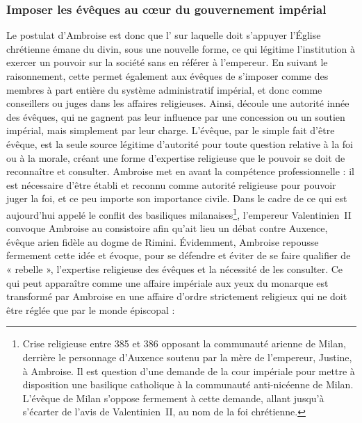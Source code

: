 \bigskip

\subsubsection{Imposer les évêques au cœur du gouvernement impérial}

Le postulat d’Ambroise est donc que l’ sur laquelle doit s’appuyer l’Église chrétienne émane du divin, sous une nouvelle forme, ce qui légitime l’institution à exercer un pouvoir sur la société sans en référer à l’empereur. En suivant le raisonnement, cette  permet également aux évêques de s’imposer comme des membres à part entière du système administratif impérial, et donc comme conseillers ou juges dans les affaires religieuses. Ainsi, découle une autorité innée des évêques, qui ne gagnent pas leur influence par une concession ou un soutien impérial, mais simplement par leur charge. L’évêque, par le simple fait d’être évêque, est la seule source légitime d’autorité pour toute question relative à la foi ou à la morale, créant une forme d'expertise religieuse que le pouvoir se doit de reconnaître et consulter. Ambroise met en avant la compétence professionnelle : il est nécessaire d’être établi et reconnu comme autorité religieuse pour pouvoir juger la foi, et ce peu importe son importance civile. Dans le cadre de ce qui est aujourd’hui appelé le conflit des basiliques milanaises\footnote{Crise religieuse entre 385 et 386 opposant la communauté arienne de Milan, derrière le personnage d’Auxence soutenu par la mère de l’empereur, Justine, à Ambroise. Il est question d'une demande de la cour impériale pour mettre à disposition une basilique catholique à la communauté anti-nicéenne de Milan. L’évêque de Milan s’oppose fermement à cette demande, allant jusqu’à s’écarter de l’avis de Valentinien~II, au nom de la foi chrétienne.}, l’empereur Valentinien~II convoque Ambroise au consistoire afin qu'ait lieu un débat contre Auxence, évêque arien fidèle au dogme de Rimini. Évidemment, Ambroise repousse fermement cette idée et évoque, pour se défendre et éviter de se faire qualifier de « rebelle », l’expertise religieuse des évêques et la nécessité de les consulter. Ce qui peut apparaître comme une affaire impériale aux yeux du monarque est transformé par Ambroise en une affaire d'ordre strictement religieux qui ne doit être réglée que par le monde épiscopal :

\bigskip

